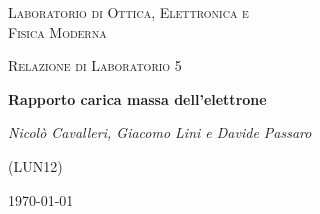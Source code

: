 \documentclass[a4paper,11pt]{article}
\begin{document}
\begin{titlepage}
	\centering
	{\scshape\LARGE Laboratorio di Ottica, Elettronica e \\ Fisica Moderna \par}
	\vspace{1cm}
	{\scshape\Large Relazione di Laboratorio 5\par}
	\vspace{1.5cm}
	{\huge\bfseries Rapporto carica massa dell'elettrone\par}
	\vspace{2cm}

	{\Large\itshape Nicolò Cavalleri, Giacomo Lini e Davide Passaro
		
	(LUN12)}

	\vspace{5cm}
	\vfill

	\begin{abstract}
		Questo documento contiene la procedura e l'analisi dati di un esperimento volto a misurare il rapporto tra la carica e la massa dell'elettrone. L'esperimento seguito non corrisponde a quello di Thompson (il primo esperimento che ottenne questa misura) ma una variante che, utilizzando una coppia di bobine di Helmholtz, riesce a produrre un campo magnetico più facilmente misurabile.
	\end{abstract}


	\vfill
	{\large \today\par}
	
\end{titlepage}

\newpage
\end{document}
